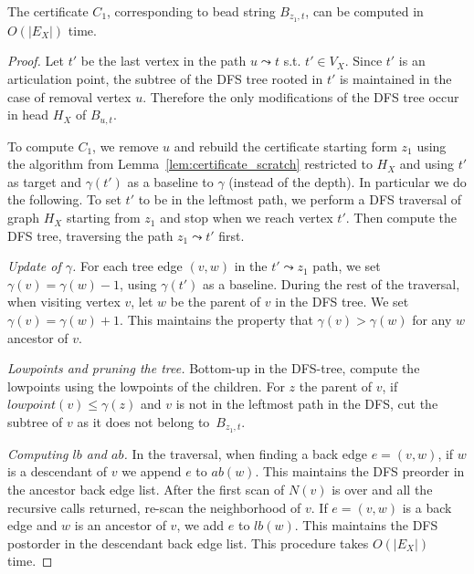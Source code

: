\begin{lemma}
	The certificate $C_1$, corresponding to bead string
	$B_{z_1,t}$, can be computed in $O(|E_X|)$ time.
\end{lemma}
\begin{proof}
	Let $t'$ be the last vertex in the path $u \leadsto t$ s.t.
	$t' \in V_X$. Since $t'$ is an articulation point, the subtree
	of the DFS tree rooted in $t'$ is maintained in the case of
	removal vertex $u$. Therefore the only modifications of the
	DFS tree occur in head $H_X$ of $B_{u,t}$.

	To compute $C_1$, we remove $u$ and rebuild the certificate
	starting form $z_1$ using the algorithm from
	Lemma~\ref{lem:certificate_scratch} restricted to $H_X$ and
	using $t'$ as target and $\gamma(t')$ as a baseline to
	$\gamma$ (instead of the depth). In particular we do
	the following.
	To set $t'$ to be in the leftmost path, we perform a
	DFS traversal of graph $H_X$ starting from $z_1$ and stop when
	we reach vertex $t'$. Then compute the DFS tree, traversing
	the path $z_1 \leadsto t'$ first.
	
	{\it Update of $\gamma$.} For each tree edge $(v,w)$ in the
	$t' \leadsto z_1$ path, we set $\gamma(v)=\gamma(w)-1$, using
	$\gamma(t')$ as a baseline.  During the rest of the traversal,
	when visiting vertex $v$, let $w$ be the parent of $v$ in the
	DFS tree. We set $\gamma(v)=\gamma(w)+1$. This maintains the
	property that $\gamma(v)>\gamma(w)$ for any $w$ ancestor of
	$v$.

	{\it Lowpoints and pruning the tree.}  Bottom-up in
	the DFS-tree, compute the lowpoints using the
	lowpoints of the children.  For $z$ the parent of $v$, if
	$\mathit{lowpoint}(v) \leq \gamma(z)$ and $v$ is not in the
	leftmost path in the DFS, cut the subtree of $v$ as it does
	not belong to~$B_{z_1,t}$.

	{\it Computing $lb$ and $ab$.} In the traversal, when finding
	a back edge $e=(v,w)$, if $w$ is a descendant of $v$ we append
	$e$ to $ab(w)$. This maintains the DFS preorder in the
	ancestor back edge list. After the first scan of $N(v)$ is
	over and all the recursive calls returned, re-scan the
	neighborhood of $v$. If $e=(v,w)$ is a back edge and $w$ is an
	ancestor of $v$, we add $e$ to $lb(w)$. This maintains the DFS
	postorder in the descendant back edge list.  This procedure
	takes $O(|E_X|)$ time.
\end{proof}


